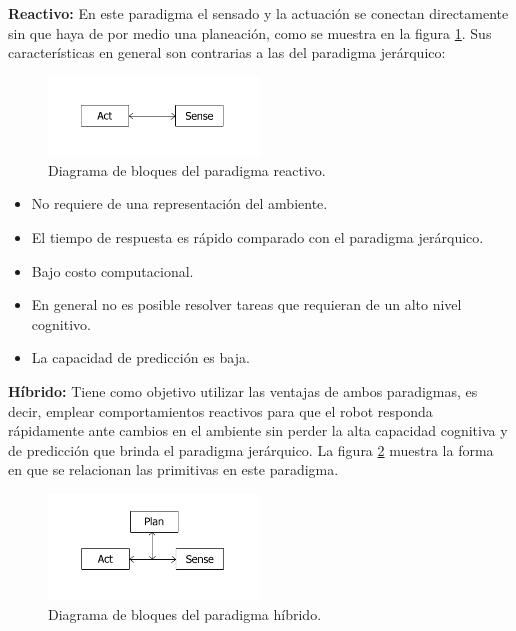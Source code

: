 \documentclass[a4paper]{article}
\begin{document}
\textbf{Reactivo:} En este paradigma el sensado y la actuación se conectan directamente sin que haya de por medio una planeación, como se muestra en la figura \ref{fig:ParadigmReactive}. Sus características en general son contrarias a las del paradigma jerárquico:
\begin{figure}
  \centering
  \includegraphics[width=0.5\textwidth]{Figures/Reactive.png}
  \caption{Diagrama de bloques del paradigma reactivo. }
  \label{fig:ParadigmReactive}
\end{figure}
\begin{itemize}
\item No requiere de una representación del ambiente.
\item El tiempo de respuesta es rápido comparado con el paradigma jerárquico.
\item Bajo costo computacional.
\item En general no es posible resolver tareas que requieran de un alto nivel cognitivo.
\item La capacidad de predicción es baja. 
\end{itemize}

\textbf{Híbrido:} Tiene como objetivo utilizar las ventajas de ambos paradigmas, es decir, emplear comportamientos reactivos para que el robot responda rápidamente ante cambios en el ambiente sin perder la alta capacidad cognitiva y de predicción que brinda el paradigma jerárquico. La figura \ref{fig:ParadigmHybrid} muestra la forma en que se relacionan las primitivas en este paradigma. 
\begin{figure}
  \centering
  \includegraphics[width=0.5\textwidth]{Figures/Hybrid.png}
  \caption{Diagrama de bloques del paradigma híbrido.}
  \label{fig:ParadigmHybrid}
\end{figure}


\end{document}
